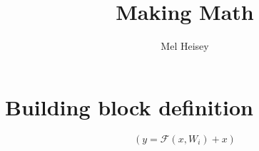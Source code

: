 \documentclass{article}
\begin{document}
\title{Making Math}
\author{Mel Heisey}

\section{Building block definition}
    $$\left(
        y = \mathcal{F}(x, {W_i}) + x
    \right)$$

\end{document}

